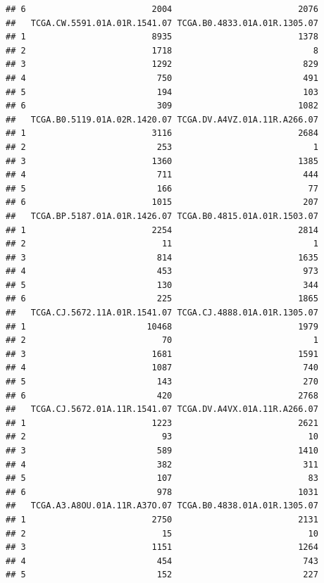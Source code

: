 \documentclass[
]{article}
\begin{document}
\begin{verbatim}
## 6                         2004                         2076
##   TCGA.CW.5591.01A.01R.1541.07 TCGA.B0.4833.01A.01R.1305.07
## 1                         8935                         1378
## 2                         1718                            8
## 3                         1292                          829
## 4                          750                          491
## 5                          194                          103
## 6                          309                         1082
##   TCGA.B0.5119.01A.02R.1420.07 TCGA.DV.A4VZ.01A.11R.A266.07
## 1                         3116                         2684
## 2                          253                            1
## 3                         1360                         1385
## 4                          711                          444
## 5                          166                           77
## 6                         1015                          207
##   TCGA.BP.5187.01A.01R.1426.07 TCGA.B0.4815.01A.01R.1503.07
## 1                         2254                         2814
## 2                           11                            1
## 3                          814                         1635
## 4                          453                          973
## 5                          130                          344
## 6                          225                         1865
##   TCGA.CJ.5672.11A.01R.1541.07 TCGA.CJ.4888.01A.01R.1305.07
## 1                        10468                         1979
## 2                           70                            1
## 3                         1681                         1591
## 4                         1087                          740
## 5                          143                          270
## 6                          420                         2768
##   TCGA.CJ.5672.01A.11R.1541.07 TCGA.DV.A4VX.01A.11R.A266.07
## 1                         1223                         2621
## 2                           93                           10
## 3                          589                         1410
## 4                          382                          311
## 5                          107                           83
## 6                          978                         1031
##   TCGA.A3.A8OU.01A.11R.A37O.07 TCGA.B0.4838.01A.01R.1305.07
## 1                         2750                         2131
## 2                           15                           10
## 3                         1151                         1264
## 4                          454                          743
## 5                          152                          227

\end{verbatim}
\end{document}
